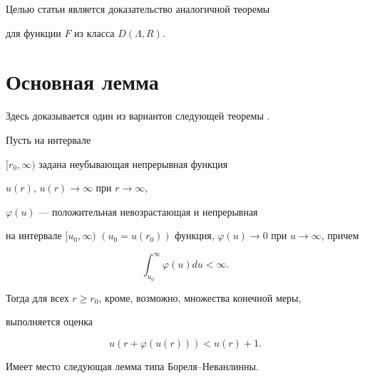 Целью статьи является доказательство аналогичной теоремы


для функции $F$ из класса $D(\Lambda,R).$





\section{Основная лемма}





Здесь доказывается один из вариантов следующей теоремы \cite{lit3}.





\begin{thm}


Пусть на интервале


$[r_{0},\infty)$ задана неубывающая непрерывная функция


$u(r)$, $u(r)\to\infty$ при $r\to\infty$,


$\varphi(u)$ --- положительная невозрастающая и непрерывная


на интервале $[u_{0},\infty)$ $(u_{0}=u(r_{0}))$ функция, $\varphi (u)\to


0$ при $u \to\infty$, причем


$$


\int_{u_{0}}^{\infty}\varphi (u)du<\infty.


$$


Тогда для всех $r\geq r_{0}$, кроме, возможно, множества конечной меры,


выполняется оценка


$$


u(r+\varphi (u(r)))<u(r)+1.


$$


\end{thm}





Имеет место следующая лемма типа Бореля--Неванлинны.





